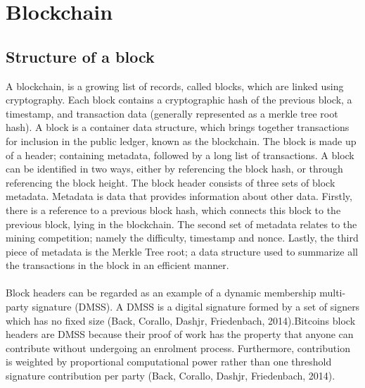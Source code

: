 \section{Blockchain}
\subsection{Structure of a block}
A blockchain, is a growing list of records, called blocks, which are linked using cryptography.
Each block contains a cryptographic hash of the previous block, a timestamp, and transaction
data (generally represented as a merkle tree root hash). A block is a container data structure,
which brings together transactions for inclusion in the public ledger, known as the blockchain.
The block is made up of a header; containing metadata, followed by a long list of transactions. A
block can be identified in two ways, either by referencing the block hash, or through referencing
the block height. The block header consists of three sets of block metadata. Metadata is data
that provides information about other data. Firstly, there is a reference to a previous block
hash, which connects this block to the previous block, lying in the blockchain. The second set of
metadata relates to the mining competition; namely the difficulty, timestamp and nonce. Lastly,
the third piece of metadata is the Merkle Tree root; a data structure used to summarize all the
transactions in the block in an efficient manner.
\paragraph{}Block headers can be regarded as an example of a dynamic membership multi-party signature
(DMSS). A DMSS is a digital signature formed by a set of signers which has no fixed size
(Back, Corallo, Dashjr,
Friedenbach, 2014).Bitcoins block headers are DMSS because their
proof of work has the property that anyone can contribute without undergoing an enrolment
process. Furthermore, contribution is weighted by proportional computational power rather than one threshold signature contribution per party (Back, Corallo, Dashjr, Friedenbach, 2014).
